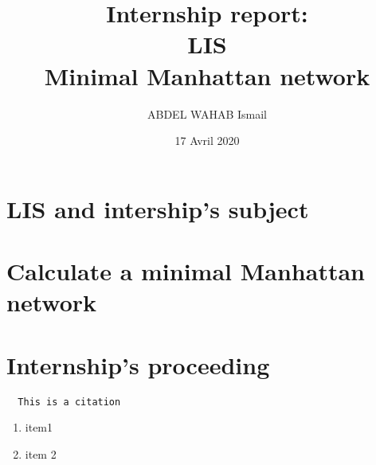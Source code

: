 \documentclass[11pt]{report}
\title{\textbf{Internship report: \\
			LIS\\  Minimal Manhattan network}}
\author{ABDEL WAHAB Ismail}
\date{17 Avril 2020}
\begin{document}
\maketitle
\thispagestyle{empty}
\renewcommand{\contentsname}{Summary}
\tableofcontents
\newpage

\iffalse --------------  Document Content-------------------------- \fi

\part{LIS and intership's subject}


\part{Calculate a minimal Manhattan network}




\part{Internship's proceeding}



\begin{quoting} \begin{verbatim}
  This is a citation
\end{verbatim} \end{quoting}

\begin{enumerate}
	\item{item1}
	\item{item 2}
\end{enumerate} 
\end{document}
